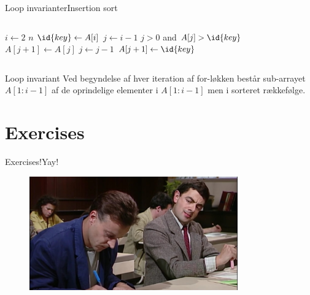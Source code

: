 \documentclass{beamer}
\begin{document}
\begin{frame}[fragile]{Loop invarianter}{Insertion sort}
\begin{columns}

        \begin{minipage}{\textwidth}%
            \small

            \vspace{-\abovedisplayskip}
            \begin{codebox}
                \li \For $i \gets 2$ \To $n$ \Do
                    \li $\id{key} \gets A[i]$
                    \li $j \gets i - 1$
                    \li \While $j > 0$ and $A[j] > \id{key}$ \Do
                        \li $A[j+1] \gets A[j]$
                        \li $j \gets j - 1$
                    \End
                    \li $A[j+1] \gets \id{key}$
                \End
            \end{codebox}
            
        \end{minipage}

    \end{columns}

    \begin{block}{Loop invariant}
        Ved begyndelse af hver iteration af \alert{for-løkken} består
        sub-arrayet $A[1:i-1]$ af de oprindelige elementer i $A[1:i-1]$ men i
        sorteret rækkefølge.
    \end{block}

\end{frame}

\section{Exercises}

\begin{frame}{Exercises!}{Yay!}
    
    \begin{figure}[h]
        \centering
        \includegraphics[width=0.8\textwidth]{exercises}
    \end{figure}
    
\end{frame}
\end{document}

